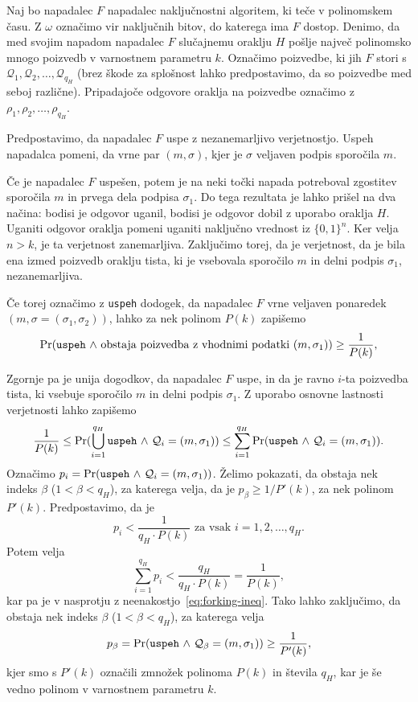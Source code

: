 \begin{dokaz}
    Naj bo napadalec $F$ napadalec naključnostni algoritem, ki teče v polinomskem času. Z $\omega$
    označimo vir naključnih bitov, do katerega ima $F$ dostop. Denimo, da med svojim napadom napadalec
    $F$ slučajnemu oraklju $H$ pošlje največ polinomsko mnogo poizvedb v varnostnem parametru $k$.
    Označimo poizvedbe, ki jih $F$ stori s $\mathcal{Q}_1, \mathcal{Q}_2, \dots, \mathcal{Q}_{q_H}$
    (brez škode za splošnost lahko predpostavimo, da so poizvedbe med seboj različne). Pripadajoče
    odgovore oraklja na poizvedbe označimo z $\rho_1, \rho_2 , \dots, \rho_{q_H}$.

    Predpostavimo, da napadalec $F$ uspe z nezanemarljivo verjetnostjo. Uspeh napadalca pomeni, da
    vrne par $(m, \sigma)$, kjer je $\sigma$ veljaven podpis sporočila $m$.

    Če je napadalec $F$ uspešen, potem je na neki točki napada potreboval zgostitev sporočila $m$
    in prvega dela podpisa $\sigma_1$. Do tega rezultata je lahko prišel na dva načina: bodisi je
    odgovor uganil, bodisi je odgovor dobil z uporabo oraklja $H$. Uganiti odgovor oraklja pomeni
    uganiti naključno vrednost iz $\{0, 1\}^n$. Ker velja $n > k$, je ta verjetnost zanemarljiva.
    Zaključimo torej, da je verjetnost, da je bila ena izmed poizvedb oraklju tista, ki je vsebovala
    sporočilo $m$ in delni podpis $\sigma_1$, nezanemarljiva.

    Če torej označimo z \texttt{uspeh} dodogek, da napadalec $F$ vrne veljaven ponaredek
    $(m, \sigma = (\sigma_1, \sigma_2))$, lahko za nek polinom $P(k)$ zapišemo
    $$
    \Pr(\text{\texttt{uspeh} $\wedge$ obstaja poizvedba z vhodnimi podatki $(m, \sigma_1)$}) \geq \frac{1}{P(k)},
    $$

    Zgornje pa je unija dogodkov, da napadalec $F$ uspe, in da je ravno $i$-ta poizvedba
    tista, ki vsebuje sporočilo $m$ in delni podpis $\sigma_1$. Z uporabo osnovne lastnosti verjetnosti
    lahko zapišemo
    \begin{equation}
    \frac{1}{P(k)} \leq \Pr(\bigcup_{i = 1}^{q_H} \text{\texttt{uspeh} $\wedge$ $\mathcal{Q}_i = (m, \sigma_1)$})
    \leq \sum_{i = 1}^{q_H} \Pr(\text{\texttt{uspeh} $\wedge$ $\mathcal{Q}_i = (m, \sigma_1)$}).
    \label{eq:forking-ineq}
    \end{equation}
    Označimo $p_i = \Pr(\text{\texttt{uspeh} $\wedge$ $\mathcal{Q}_i = (m, \sigma_1)$})$.
    Želimo pokazati, da obstaja nek indeks $\beta$ ($1 < \beta < q_H$), za katerega velja, da je
    $p_\beta \geq 1/P'(k)$, za nek polinom $P'(k)$. Predpostavimo, da je
    $$
    p_i < \frac{1}{q_H \cdot P(k)} \text{ za vsak } i = 1, 2, \dots, q_H.
    $$
    Potem velja
    $$
    \sum_{i = 1}^{q_H} p_i < \frac{q_H}{q_H \cdot P(k)} = \frac{1}{P(k)},
    $$
    kar pa je v nasprotju z neenakostjo~\eqref{eq:forking-ineq}. Tako lahko zaključimo, da obstaja
    nek indeks $\beta$ ($1 < \beta < q_H$), za katerega velja
    $$
    p_\beta = \Pr(\text{\texttt{uspeh} $\wedge$ $\mathcal{Q}_\beta = (m, \sigma_1)$})
    \geq \frac{1}{P'(k)},
    $$
    kjer smo s $P'(k)$ označili zmnožek polinoma $P(k)$ in števila $q_H$, kar je še vedno polinom
    v varnostnem parametru $k$.


\end{dokaz}
